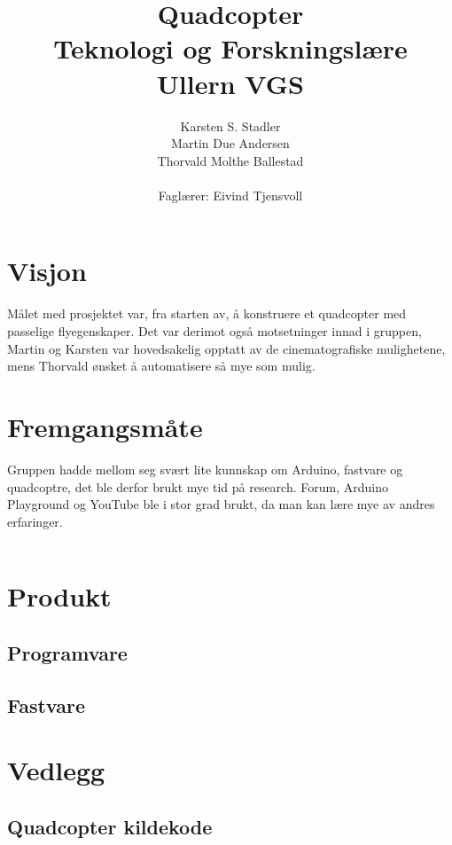 \documentclass{article}
\title{Quadcopter\\
Teknologi og Forskningslære\\
Ullern VGS}
\author{Karsten S. Stadler\\
Martin Due Andersen\\
Thorvald Molthe Ballestad\\\\
Faglærer: Eivind Tjensvoll}
\begin{document}
\maketitle

\tableofcontents
\newpage


\section{Visjon}
Målet med prosjektet var, fra starten av, å konstruere et quadcopter med passelige flyegenskaper. Det var derimot også motsetninger innad i gruppen, Martin og Karsten var hovedsakelig opptatt av de cinematografiske mulighetene, mens Thorvald ønsket å automatisere så mye som mulig.
\section{Fremgangsmåte}
Gruppen hadde mellom seg svært lite kunnskap om Arduino, fastvare og quadcoptre, det ble derfor brukt mye tid på research. Forum, Arduino Playground og YouTube ble i stor grad brukt, da man kan lære mye av andres erfaringer. 

\begin{tabular}{c}

\end{tabular}
\section{Produkt}
\subsection{Programvare}
\subsection{Fastvare}
\section{Vedlegg}
\subsection{Quadcopter kildekode}

\end{document}
